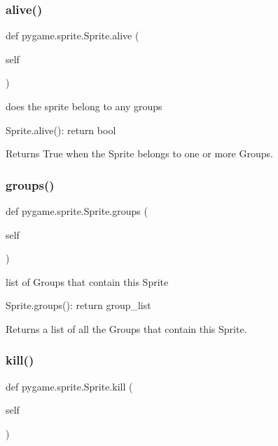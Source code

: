 \subsubsection{\texorpdfstring{alive()}{alive()}}
{\footnotesize\ttfamily def pygame.\+sprite.\+Sprite.\+alive (\begin{DoxyParamCaption}\item[{}]{self }\end{DoxyParamCaption})}

\begin{DoxyVerb}does the sprite belong to any groups

Sprite.alive(): return bool

Returns True when the Sprite belongs to one or more Groups.
\end{DoxyVerb}
 \mbox{\label{classpygame_1_1sprite_1_1_sprite_a737da7fd292c7463b925d512d0cb1ccf}} 
\subsubsection{\texorpdfstring{groups()}{groups()}}
{\footnotesize\ttfamily def pygame.\+sprite.\+Sprite.\+groups (\begin{DoxyParamCaption}\item[{}]{self }\end{DoxyParamCaption})}

\begin{DoxyVerb}list of Groups that contain this Sprite

Sprite.groups(): return group_list

Returns a list of all the Groups that contain this Sprite.\end{DoxyVerb}
 \mbox{\label{classpygame_1_1sprite_1_1_sprite_adfb628d03641a767b2ade7347568dfe3}} 
\subsubsection{\texorpdfstring{kill()}{kill()}}
{\footnotesize\ttfamily def pygame.\+sprite.\+Sprite.\+kill (\begin{DoxyParamCaption}\item[{}]{self }\end{DoxyParamCaption})}

